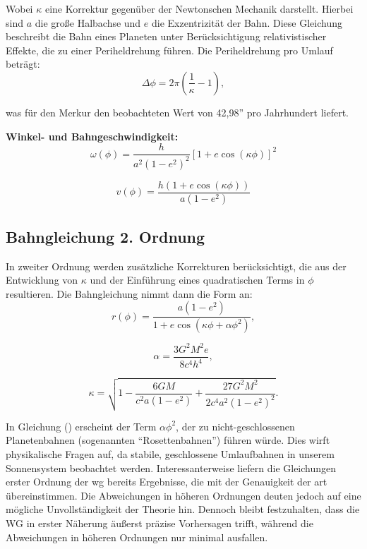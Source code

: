 Wobei $\kappa$ eine Korrektur gegenüber der Newtonschen Mechanik darstellt. Hierbei sind $a$ die große Halbachse und $e$ die Exzentrizität der Bahn.
Diese Gleichung beschreibt die Bahn eines Planeten unter Berücksichtigung relativistischer Effekte, die zu einer Periheldrehung führen.
Die Periheldrehung pro Umlauf beträgt:
\begin{equation}
\Delta \phi = 2\pi \left(\frac{1}{\kappa} - 1\right),
\end{equation}

was für den Merkur den beobachteten Wert von 42,98'' pro Jahrhundert liefert.

\textbf{Winkel- und Bahngeschwindigkeit:}
\begin{equation}
\omega(\phi) = \frac{h}{a^2(1 - e^2)^2} \left[1 + e \cos(\kappa \phi)\right]^2    
\end{equation}

\begin{equation}    
v(\phi) = \frac{h \left(1 + e \cos(\kappa \phi)\right)}{a(1 - e^2)}
\end{equation}

\subsection{Bahngleichung 2. Ordnung}
In zweiter Ordnung werden zusätzliche Korrekturen berücksichtigt, die aus der Entwicklung von $\kappa$ und der Einführung eines quadratischen Terms in $\phi$ resultieren.
Die Bahngleichung nimmt dann die Form an:
\begin{equation}
\label{eq:weber_r_2_ordnung}
r(\phi) = \frac{a(1 - e^2)}{1 + e \cos(\kappa \phi + \alpha \phi^2)},
\end{equation}

\begin{equation}
\alpha = \frac{3G^2 M^2 e}{8c^4 h^4},
\end{equation}

\begin{equation}
\kappa = \sqrt{1 - \frac{6GM}{c^2 a(1 - e^2)} + \frac{27G^2 M^2}{2c^4 a^2 (1 - e^2)^2}}.
\end{equation}

In Gleichung () erscheint der Term $\alpha \phi^2$, der zu nicht-geschlossenen Planetenbahnen (sogenannten \enquote{Rosettenbahnen}) führen würde.
Dies wirft physikalische Fragen auf, da stabile, geschlossene Umlaufbahnen in unserem Sonnensystem beobachtet werden. Interessanterweise liefern die Gleichungen erster Ordnung
der \gls{wg} bereits Ergebnisse, die mit der Genauigkeit der \gls{art} übereinstimmen. Die Abweichungen in höheren Ordnungen deuten jedoch auf eine mögliche Unvollständigkeit der
Theorie hin. Dennoch bleibt festzuhalten, dass die WG in erster Näherung äußerst präzise Vorhersagen trifft, während die Abweichungen in höheren Ordnungen nur minimal ausfallen.

